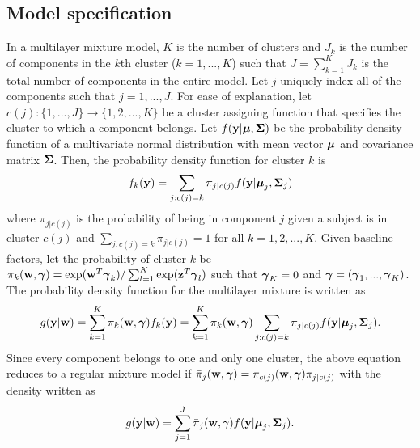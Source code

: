 \subsection{Model specification}
In a multilayer mixture model, $K$ is the number of clusters and $J_{k}$ is the number of components in the $k$th cluster ($k=1,...,K$) such that $J=\sum_{k=1}^{K}J_{k}$ is the total number of components in the entire model. Let $j$ uniquely index all of the components such that $j=1,...,J$. For ease of explanation, let $c(j):\{1,...,J\}\rightarrow \{1,2,...,K\}$ be a cluster assigning function that specifies the cluster to which a component belongs. Let $f(\mathbf y|\boldsymbol\mu,\boldsymbol\Sigma)$ be the probability density function of a multivariate normal distribution with mean vector $\boldsymbol\mu$ and covariance matrix $\boldsymbol\Sigma$. Then, the probability density function for cluster $k$ is
$$f_{k}(\mathbf y) = \sum_{j: c(j) = k} \pi_{j|c(j)}f(\mathbf y|\boldsymbol\mu_{j},\boldsymbol \Sigma_{j})$$
where $\pi_{j|c(j)}$ is the probability of being in component $j$ given a subject is in cluster $c(j)$ and $\sum_{j: c(j) = k}\pi_{j|c(j)}=1$ for all $k=1,2,...,K$. Given baseline factors, let the probability of cluster $k$ be $\pi_{k}(\mathbf w,\boldsymbol\gamma)=\exp(\mathbf w^{T}\boldsymbol\gamma_{k})/\sum^{K}_{l=1}\exp(\mathbf z^{T}\boldsymbol\gamma_{l})$ such that $\boldsymbol\gamma_{K}=0$ and $\boldsymbol\gamma=(\boldsymbol\gamma_{1},...,\boldsymbol\gamma_{K})$. The probability density function for the multilayer mixture is written as
$$g(\mathbf y|\mathbf w) = \sum_{k=1}^{K}\pi_{k}(\mathbf w,\boldsymbol \gamma)f_{k}(\mathbf y) = \sum_{k=1}^{K}\pi_{k}(\mathbf w,\boldsymbol\gamma)\sum_{j: c(j) = k} \pi_{j|c(j)}f( \mathbf y| \boldsymbol\mu_{j},\boldsymbol\Sigma_{j}).$$
Since every component belongs to one and only one cluster, the above equation reduces to a regular mixture model if $\bar{\pi}_{j}(\mathbf w,\boldsymbol \gamma)=\pi_{c(j)}(\mathbf w,\boldsymbol\gamma)\pi_{j|c(j)}$ with the density written as
$$g(\mathbf y|\mathbf w) = \sum_{j=1}^{J}\bar{\pi}_{j}(\mathbf w,\gamma)f(\mathbf y|\boldsymbol \mu_{j},\boldsymbol\Sigma_{j}).$$


